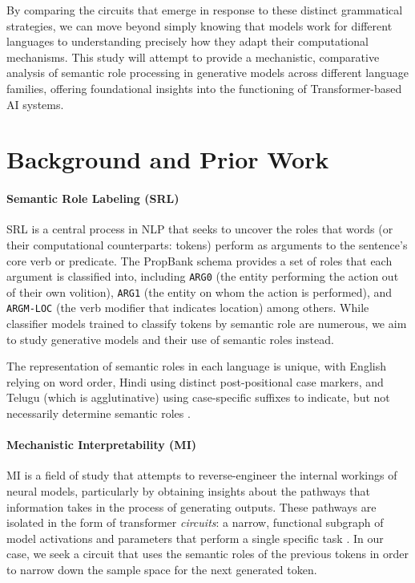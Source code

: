 \documentclass[11pt]{article}
\begin{document}
By comparing the circuits that emerge in response to these distinct grammatical strategies, we can move beyond simply knowing that models work for different languages to understanding precisely how they adapt their computational mechanisms. This study will attempt to provide a mechanistic, comparative analysis of semantic role processing in generative models across different language families, offering foundational insights into the functioning of Transformer-based AI systems.
\section{Background and Prior Work}
\label{sec:org45d588b}

\paragraph{Semantic Role Labeling (SRL)}
SRL is a central process in NLP that seeks to uncover the roles that words (or their computational counterparts: tokens) perform as arguments to the sentence's core verb or predicate. The PropBank \citep{10.1162/0891201053630264} schema provides a set of roles that each argument is classified into, including \texttt{ARG0} (the entity performing the action out of their own volition), \texttt{ARG1} (the entity on whom the action is performed), and \texttt{ARGM-LOC} (the verb modifier that indicates location) among others. While classifier models trained to classify tokens by semantic role are numerous, we aim to study generative models and their use of semantic roles instead.

The representation of semantic roles in each language is unique, with English relying on word order, Hindi using distinct post-positional case markers, and Telugu (which is agglutinative) using case-specific suffixes to indicate, but not necessarily determine semantic roles \citep{vaidya-etal-2011-analysis}.

\paragraph{Mechanistic Interpretability (MI)}
MI is a field of study that attempts to reverse-engineer the internal workings of neural models, particularly by obtaining insights about the pathways that information takes in the process of generating outputs. These pathways are isolated in the form of transformer \emph{circuits}: a narrow, functional subgraph of model activations and parameters that perform a single specific task \citep{elhage2021mathematical}. In our case, we seek a circuit that uses the semantic roles of the previous tokens in order to narrow down the sample space for the next generated token.
\end{document}
